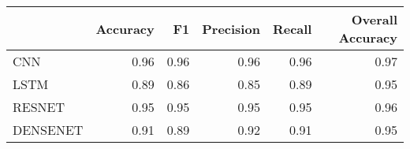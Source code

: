 \begin{tabular}{lrrrrr}
\toprule
{} &  Accuracy &    F1 &  Precision &  Recall &  Overall Accuracy \\
\midrule
CNN      &      0.96 &  0.96 &       0.96 &    0.96 &              0.97 \\
LSTM     &      0.89 &  0.86 &       0.85 &    0.89 &              0.95 \\
RESNET   &      0.95 &  0.95 &       0.95 &    0.95 &              0.96 \\
DENSENET &      0.91 &  0.89 &       0.92 &    0.91 &              0.95 \\
\bottomrule
\end{tabular}
